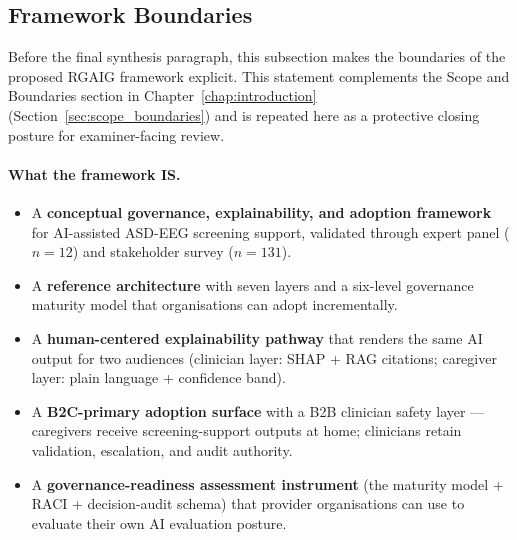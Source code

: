 \subsection{Framework Boundaries}
\label{sec:framework_boundaries}

Before the final synthesis paragraph, this subsection makes the boundaries of the proposed RGAIG framework explicit. This statement complements the Scope and Boundaries section in Chapter~\ref{chap:introduction} (Section~\ref{sec:scope_boundaries}) and is repeated here as a protective closing posture for examiner-facing review.

\paragraph{What the framework IS.}
\begin{itemize}[leftmargin=*, itemsep=3pt]
    \item A \textbf{conceptual governance, explainability, and adoption framework} for AI-assisted ASD-EEG screening support, validated through expert panel ($n=12$) and stakeholder survey ($n=131$).
    \item A \textbf{reference architecture} with seven layers and a six-level governance maturity model that organisations can adopt incrementally.
    \item A \textbf{human-centered explainability pathway} that renders the same AI output for two audiences (clinician layer: SHAP + RAG citations; caregiver layer: plain language + confidence band).
    \item A \textbf{B2C-primary adoption surface} with a B2B clinician safety layer --- caregivers receive screening-support outputs at home; clinicians retain validation, escalation, and audit authority.
    \item A \textbf{governance-readiness assessment instrument} (the maturity model + RACI + decision-audit schema) that provider organisations can use to evaluate their own AI evaluation posture.
\end{itemize}

